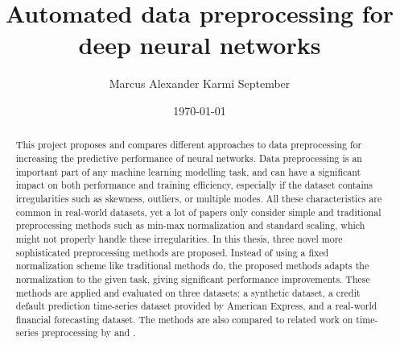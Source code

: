 \documentclass{statsmsc}
\title{Automated data preprocessing for deep neural networks}
\author{Marcus Alexander Karmi September}
\date{\today}
\begin{document}

\maketitle


\declarationdate{\today}
\declaration

\begin{abstract}
    This project proposes and compares different approaches to data preprocessing for
    increasing the predictive performance of neural networks.
    Data preprocessing is an important part of any machine learning modelling task, and
    can have a significant impact on both performance and training efficiency, especially
    if the dataset contains irregularities such as skewness, outliers, or multiple modes.
    All these characteristics are common in real-world datasets, yet a lot of papers only consider
    simple and traditional preprocessing methods such as min-max normalization and standard scaling, which might
    not properly handle these irregularities. 
    In this thesis, three novel more sophisticated preprocessing methods are proposed.
    Instead of using a fixed normalization scheme like traditional methods do, the
    proposed methods adapts the normalization to the given task, giving significant
    performance improvements. These methods are applied
    and evaluated on three datasets: a synthetic dataset, a credit default prediction
    time-series dataset provided by American Express, and a real-world financial forecasting dataset.
    The methods are also compared to related work on time-series preprocessing by \cite{dain} and \cite{bin}.

\end{abstract}
\end{document}
